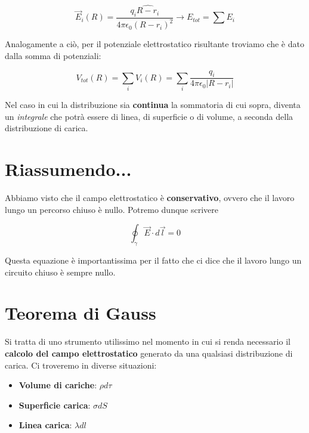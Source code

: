 \begin{equation}
	\vec{E}_i(R) = \frac{q_i \widehat{R-r_i}}{4\pi\epsilon_0 \left(R-r_i\right)^2} \rightarrow E_{tot} = \sum E_i
\end{equation}

Analogamente a ciò, per il potenziale elettrostatico risultante troviamo che è dato dalla somma di potenziali: 

\begin{equation}
	V_{tot}(R) = \sum_{i} V_i(R) = \sum_{i} \frac{q_i}{4\pi\epsilon_0 |R-r_i|}
\end{equation}

Nel caso in cui la distribuzione sia \textbf{continua} la sommatoria di cui sopra, diventa un \textit{integrale} che potrà essere di linea, di superficie o di volume, a seconda della distribuzione di carica. 

\section{Riassumendo...}
Abbiamo visto che il campo elettrostatico è \textbf{conservativo}, ovvero che il lavoro lungo un percorso chiuso è nullo. Potremo dunque scrivere

\begin{tcolorbox}[title=1° Equazione di Maxwell]
	\begin{equation}\label{eq_Mawell}
		\oint_{\gamma} \vec{E} \cdot d\vec{l} = 0
	\end{equation}
\end{tcolorbox}

Questa equazione è importantissima per il fatto che ci dice che il lavoro lungo un circuito chiuso è sempre nullo. 

\section{Teorema di Gauss}
Si tratta di uno strumento utilissimo nel momento in cui si renda necessario il \textbf{calcolo del campo elettrostatico} generato da una qualsiasi distribuzione di carica. Ci troveremo in diverse situazioni: 

\begin{itemize}
	\item \textbf{Volume di cariche}: $\rho d\tau$
	\item \textbf{Superficie carica}: $ \sigma dS$
	\item \textbf{Linea carica}:  $\lambda dl$
\end{itemize}

